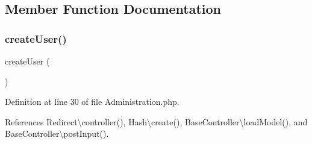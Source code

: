 \subsection{Member Function Documentation}
\hypertarget{class_administration_a967982ee98f05287bbdba812f6016947}{}\label{class_administration_a967982ee98f05287bbdba812f6016947} 
\subsubsection{\texorpdfstring{create\+User()}{createUser()}}
{\footnotesize\ttfamily create\+User (\begin{DoxyParamCaption}{ }\end{DoxyParamCaption})}



Definition at line 30 of file Administration.\+php.



References Redirect\textbackslash{}controller(), Hash\textbackslash{}create(), Base\+Controller\textbackslash{}load\+Model(), and Base\+Controller\textbackslash{}post\+Input().


